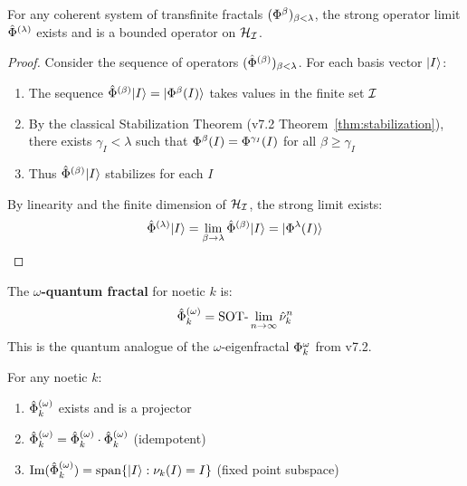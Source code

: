 \begin{theorem}
\label{thm:transfinite-limit}
For any coherent system of transfinite fractals $(\Phi^{\beta})_{\beta < \lambda}$, the strong operator limit $\hat{\Phi}^{(\lambda)}$ exists and is a bounded operator on $\mathcal{H}_{\mathcal{I}}$.
\end{theorem}

\begin{proof}
Consider the sequence of operators $(\hat{\Phi}^{(\beta)})_{\beta < \lambda}$. For each basis vector $|I\rangle$:
\begin{enumerate}
  \item The sequence $\hat{\Phi}^{(\beta)}|I\rangle = |\Phi^{\beta}(I)\rangle$ takes values in the finite set $\mathcal{I}$
  \item By the classical Stabilization Theorem (v7.2 Theorem~\ref{thm:stabilization}), there exists $\gamma_I < \lambda$ such that $\Phi^{\beta}(I) = \Phi^{\gamma_I}(I)$ for all $\beta \geq \gamma_I$
  \item Thus $\hat{\Phi}^{(\beta)}|I\rangle$ stabilizes for each $I$
\end{enumerate}
By linearity and the finite dimension of $\mathcal{H}_{\mathcal{I}}$, the strong limit exists:
\[
\hat{\Phi}^{(\lambda)}|I\rangle = \lim_{\beta \to \lambda} \hat{\Phi}^{(\beta)}|I\rangle = |\Phi^{\lambda}(I)\rangle
\]
\end{proof}

\begin{definition}
\label{def:omega-qfractal}
The \textbf{$\omega$-quantum fractal} for noetic $k$ is:
\[
\hat{\Phi}^{(\omega)}_k = \mathrm{SOT}\text{-}\lim_{n \to \infty} \hat{\nu}_k^n
\]
This is the quantum analogue of the $\omega$-eigenfractal $\Phi^{\omega}_k$ from v7.2.
\end{definition}

\begin{theorem}
\label{thm:omega-convergence}
For any noetic $k$:
\begin{enumerate}
  \item $\hat{\Phi}^{(\omega)}_k$ exists and is a projector
  \item $\hat{\Phi}^{(\omega)}_k = \hat{\Phi}^{(\omega)}_k \cdot \hat{\Phi}^{(\omega)}_k$ (idempotent)
  \item $\mathrm{Im}(\hat{\Phi}^{(\omega)}_k) = \mathrm{span}\{|I\rangle : \nu_k(I) = I\}$ (fixed point subspace)
\end{enumerate}
\end{theorem}

